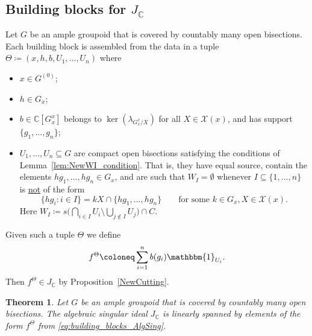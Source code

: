 \documentclass[11pt, oneside, reqno]{amsart}
\newcommand{\Gu}{G^{(0)}}
\newtheorem{thm}{Theorem}[section]
\theoremstyle{definition}
\theoremstyle{remark}
\numberwithin{equation}{section}
\begin{document}
\subsection{Building blocks for $J_\mathbb{C}$}\label{subsec:BuildingBlocksAlgSing} Let $G$ be an ample groupoid that is covered by countably many open bisections. Each building block is assembled from the data in a tuple $\Theta \coloneq (x, h, b, U_1, \dots, U_n)$ where
\begin{itemize}
    \item $x \in \Gu$;
    \item $h \in G_x$;
    \item $b \in \mathbb{C}[G^x_x]$ belongs to $\ker(\lambda_{G^x_x/X})$ for all $X \in \mathcal{X}(x)$, and has support $\{g_1, \dots, g_n\}$;
    \item $U_1, \dots, U_n \subseteq G$ are compact open bisections satisfying the conditions of Lemma~\ref{lem:NewWI_condition}. That is, they have equal source, contain the elements $hg_1, \dots, hg_n \in G_x$, and are such that $W_I = \emptyset$ whenever $I \subseteq \{1, \dotsc, n\}$ is \underline{not} of the form
        \[
        \{hg_i \colon i \in I\} = kX\cap \{hg_1, \dots, hg_n\} \quad \quad \text{for some } k \in G_{x}, X \in \mathcal{X}(x).
        \]
    Here $W_I \coloneq s\big( \bigcap_{i \in I} U_i \setminus \bigcup_{j \notin I} U_j \big) \cap C$. 
\end{itemize}
Given such a tuple $\Theta$ we define
\begin{equation}\label{eq:building_blocks_AlgSing}
f^\Theta \coloneq \sum_{i=1}^n b(g_i) \mathbbm{1}_{U_i}.
\end{equation}
Then $f^\Theta \in J_{\mathbb{C}}$ by Proposition~\ref{NewCutting}.

\begin{thm}\label{SpanAlgSing}
    Let $G$ be an ample groupoid that is covered by countably many open bisections. The algebraic singular ideal $J_\mathbb{C}$ is linearly spanned by elements of the form $f^\Theta$ from \eqref{eq:building_blocks_AlgSing}.
\end{thm}
\end{document}
